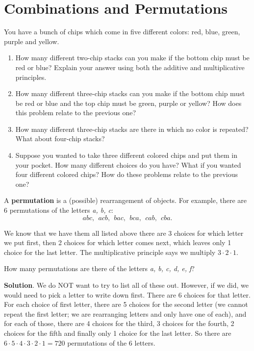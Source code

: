 \documentclass[11pt,]{book}
\newcommand{\terminology}[1]{\textbf{#1}}
\theoremstyle{ptxplainnotitle}
\theoremstyle{ptxplaintitle}
\theoremstyle{ptxdefinitionnotitle}
\theoremstyle{ptxdefinitiontitle}
\theoremstyle{ptxdefinitionnotitle}
\theoremstyle{ptxdefinitiontitle}
\theoremstyle{ptxdefinitionnotitle}
\theoremstyle{ptxdefinitiontitle}
\theoremstyle{ptxdefinitiontitlenonumber}
\theoremstyle{ptxdefinitiontitlenonumber}
\numberwithin{equation}{chapter}
\begin{document}
\section[{Combinations and Permutations}]{Combinations and Permutations}\label{sec_counting-combperm}
\begin{investigation}\label{investigation-13}
\hypertarget{p-1411}{}%
You have a bunch of chips which come in five different colors: red, blue, green, purple and yellow. %
\begin{enumerate}
\item\hypertarget{li-619}{}\hypertarget{p-1412}{}%
How many different two-chip stacks can you make if the bottom chip must be red or blue? Explain your answer using both the additive and multiplicative principles.%
\item\hypertarget{li-620}{}\hypertarget{p-1413}{}%
How many different three-chip stacks can you make if the bottom chip must be red or blue and the top chip must be green, purple or yellow? How does this problem relate to the previous one?%
\item\hypertarget{li-621}{}\hypertarget{p-1414}{}%
How many different three-chip stacks are there in which no color is repeated? What about four-chip stacks?%
\item\hypertarget{li-622}{}\hypertarget{p-1415}{}%
Suppose you wanted to take three different colored chips and put them in your pocket. How many different choices do you have? What if you wanted four different colored chips? How do these problems relate to the previous one?%
\end{enumerate}
%
\end{investigation}
\hypertarget{p-1416}{}%
A \terminology{permutation} is a (possible) rearrangement of objects. For example, there are 6 permutations of the letters \emph{a, b, c}:%
\begin{equation*}
abc, ~~ acb, ~~ bac, ~~bca, ~~ cab, ~~ cba.
\end{equation*}
%
\par
\hypertarget{p-1417}{}%
We know that we have them all listed above \textemdash{}there are 3 choices for which letter we put first, then 2 choices for which letter comes next, which leaves only 1 choice for the last letter. The multiplicative principle says we multiply \(3\cdot 2 \cdot 1\).%
\begin{example}\label{example-42}
\hypertarget{p-1418}{}%
How many permutations are there of the letters \emph{a, b, c, d, e, f}?%
\par\smallskip%
\noindent\textbf{Solution}.\hypertarget{solution-169}{}\quad%
\hypertarget{p-1419}{}%
We do NOT want to try to list all of these out. However, if we did, we would need to pick a letter to write down first. There are 6 choices for that letter. For each choice of first letter, there are 5 choices for the second letter (we cannot repeat the first letter; we are rearranging letters and only have one of each), and for each of those, there are 4 choices for the third, 3 choices for the fourth, 2 choices for the fifth and finally only 1 choice for the last letter. So there are \(6 \cdot 5 \cdot 4 \cdot 3 \cdot 2 \cdot 1 = 720\) permutations of the 6 letters.%
\end{example}
\end{document}
